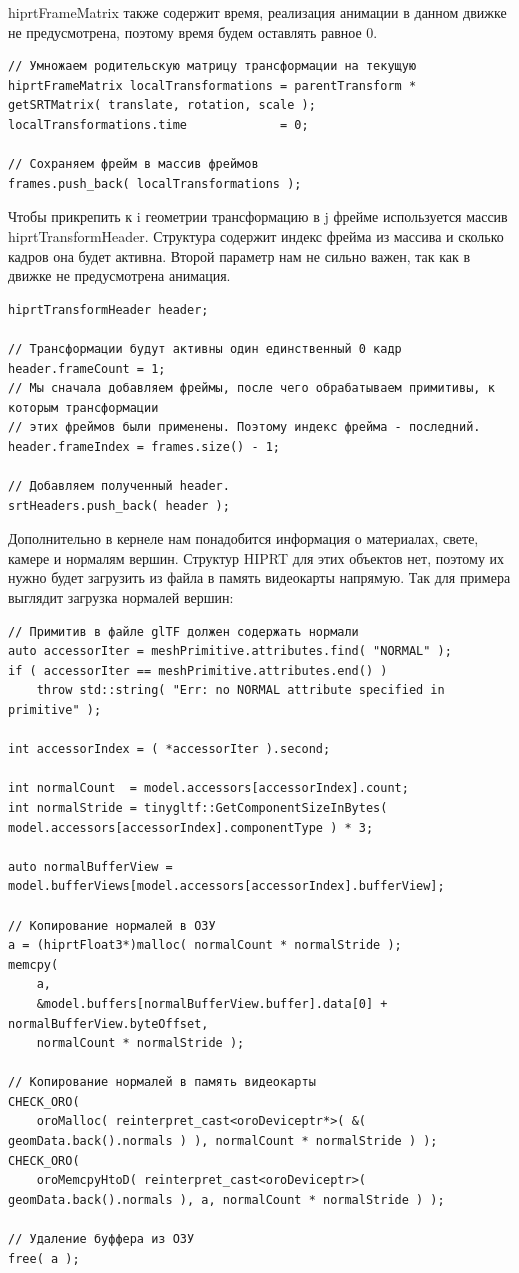 \documentclass[a4paper,14pt]{extarticle}
\begin{document}
hiprtFrameMatrix также содержит время, реализация анимации в данном движке не предусмотрена, поэтому время будем оставлять равное 0.
\begin{verbatim}
// Умножаем родительскую матрицу трансформации на текущую
hiprtFrameMatrix localTransformations = parentTransform * getSRTMatrix( translate, rotation, scale );
localTransformations.time			  = 0;

// Сохраняем фрейм в массив фреймов
frames.push_back( localTransformations );
\end{verbatim}    

Чтобы прикрепить к i геометрии трансформацию в j фрейме используется массив hiprtTransformHeader. 
Структура содержит индекс фрейма из массива и сколько кадров она будет активна. Второй параметр нам не сильно важен, 
так как в движке не предусмотрена анимация. 
\begin{verbatim}
hiprtTransformHeader header;

// Трансформации будут активны один единственный 0 кадр
header.frameCount = 1;
// Мы сначала добавляем фреймы, после чего обрабатываем примитивы, к которым трансформации
// этих фреймов были применены. Поэтому индекс фрейма - последний.
header.frameIndex = frames.size() - 1;

// Добавляем полученный header.
srtHeaders.push_back( header );
\end{verbatim} 

Дополнительно в кернеле нам понадобится информация о материалах, свете, камере и нормалям вершин. 
Структур HIPRT для этих объектов нет, поэтому их нужно будет загрузить из файла в память видеокарты напрямую. 
Так для примера выглядит загрузка нормалей вершин:
\begin{verbatim}
// Примитив в файле glTF должен содержать нормали
auto accessorIter = meshPrimitive.attributes.find( "NORMAL" );
if ( accessorIter == meshPrimitive.attributes.end() )
    throw std::string( "Err: no NORMAL attribute specified in primitive" );

int accessorIndex = ( *accessorIter ).second;

int normalCount	 = model.accessors[accessorIndex].count;
int normalStride = tinygltf::GetComponentSizeInBytes( model.accessors[accessorIndex].componentType ) * 3;

auto normalBufferView = model.bufferViews[model.accessors[accessorIndex].bufferView];

// Копирование нормалей в ОЗУ
a = (hiprtFloat3*)malloc( normalCount * normalStride );
memcpy(
    a,
    &model.buffers[normalBufferView.buffer].data[0] + normalBufferView.byteOffset,
    normalCount * normalStride );

// Копирование нормалей в память видеокарты
CHECK_ORO(
    oroMalloc( reinterpret_cast<oroDeviceptr*>( &( geomData.back().normals ) ), normalCount * normalStride ) );
CHECK_ORO(
    oroMemcpyHtoD( reinterpret_cast<oroDeviceptr>( geomData.back().normals ), a, normalCount * normalStride ) );

// Удаление буффера из ОЗУ
free( a );
\end{verbatim} 
\end{document}
